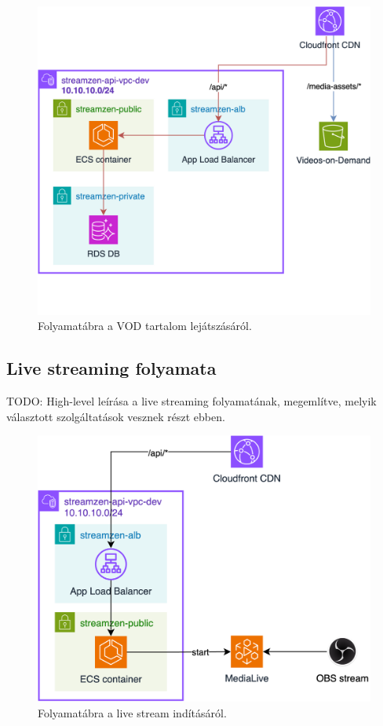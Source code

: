 \begin{figure}[ht]
	\centering
	\includegraphics[width=120mm, keepaspectratio]{figures/dipterv_vod3.png}
	\caption{Folyamatábra a VOD tartalom lejátszásáról.}
	\label{fig:vod3}
\end{figure}

\subsection{Live streaming folyamata}

TODO: High-level leírása a live streaming folyamatának, megemlítve, melyik választott szolgáltatások vesznek részt ebben.

\begin{figure}[ht]
	\centering
	\includegraphics[width=120mm, keepaspectratio]{figures/dipterv_live1.png}
	\caption{Folyamatábra a live stream indításáról.}
	\label{fig:live1}
\end{figure}

